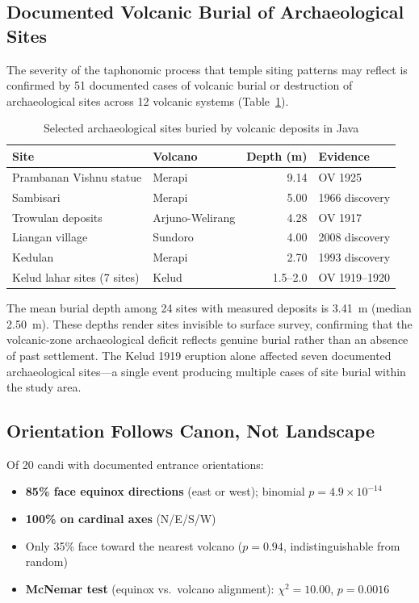 \documentclass[12pt,a4paper]{article}
\begin{document}
\subsection{Documented Volcanic Burial of Archaeological Sites}

The severity of the taphonomic process that temple siting patterns may reflect is confirmed by 51 documented cases of volcanic burial or destruction of archaeological sites across 12 volcanic systems (Table~\ref{tab:burial}).

\begin{table}[h]
\centering
\caption{Selected archaeological sites buried by volcanic deposits in Java}
\begin{tabular}{llrl}
\toprule
Site & Volcano & Depth (m) & Evidence \\
\midrule
Prambanan Vishnu statue & Merapi & 9.14 & OV 1925 \\
Sambisari & Merapi & 5.00 & 1966 discovery \\
Trowulan deposits & Arjuno-Welirang & 4.28 & OV 1917 \\
Liangan village & Sundoro & 4.00 & 2008 discovery \\
Kedulan & Merapi & 2.70 & 1993 discovery \\
Kelud lahar sites (7 sites) & Kelud & 1.5--2.0 & OV 1919--1920 \\
\bottomrule
\end{tabular}
\label{tab:burial}
\end{table}

The mean burial depth among 24 sites with measured deposits is 3.41~m (median 2.50~m). These depths render sites invisible to surface survey, confirming that the volcanic-zone archaeological deficit reflects genuine burial rather than an absence of past settlement. The Kelud 1919 eruption alone affected seven documented archaeological sites---a single event producing multiple cases of site burial within the study area.

\subsection{Orientation Follows Canon, Not Landscape}

Of 20 candi with documented entrance orientations:
\begin{itemize}
    \item \textbf{85\% face equinox directions} (east or west); binomial $p=4.9\times10^{-14}$
    \item \textbf{100\% on cardinal axes} (N/E/S/W)
    \item Only 35\% face toward the nearest volcano ($p=0.94$, indistinguishable from random)
    \item \textbf{McNemar test} (equinox vs.\ volcano alignment): $\chi^2=10.00$, $p=0.0016$
\end{itemize}
\end{document}
